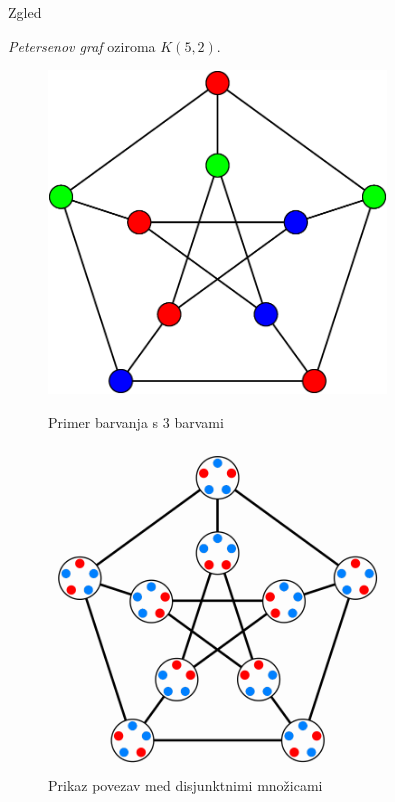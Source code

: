 \documentclass{beamer}
\begin{document}

\begin{frame}{Zgled}

{\em Petersenov graf} oziroma $K(5,2)$.

\begin{figure}[h!]
	\centering
	\begin{minipage}{0.45\textwidth}
		\centering
		\includegraphics[width=0.8\textwidth]{petersenov_graf_barvanje} %
        	\caption{Primer barvanja s $3$ barvami}
    	\end{minipage}\hfill
    	\begin{minipage}{0.45\textwidth}
       	 \centering
        	 \includegraphics[width=0.8\textwidth]{petersenov_graf_mnozice} %
       	 \caption{Prikaz povezav med disjunktnimi množicami}
    	\end{minipage}
\end{figure}

\end{frame}
\end{document}
